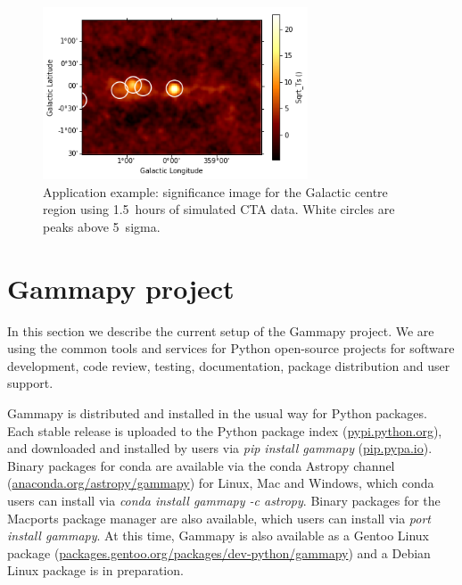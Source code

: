 \documentclass{PoS}
\newcommand{\urlPypi}{\href{https://pypi.python.org}{pypi.python.org}}
\newcommand{\urlPip}{\href{https://pip.pypa.io}{pip.pypa.io}}
\newcommand{\urlAnacondaGammapy}{\href{https://anaconda.org/astropy/gammapy}{anaconda.org/astropy/gammapy}}
\newcommand{\urlGentooGammapy}{\href{https://packages.gentoo.org/packages/dev-python/gammapy}{packages.gentoo.org/packages/dev-python/gammapy}}
\begin{document}


\begin{figure}[t]
\centering
\includegraphics[width=0.7\textwidth]{figures/gammapy_example_sky_image.png}
\caption{
Application example: significance image for the Galactic centre region using
1.5~hours of simulated CTA data.  White circles are peaks above 5~sigma.
}
\label{fig:app}
\end{figure}

\section{Gammapy project}
\label{sec:project}

In this section we describe the current setup of the Gammapy project. We are using the common tools and services for Python open-source projects for software
development, code review, testing, documentation, package distribution and user
support.

Gammapy is distributed and installed in the usual way for Python packages. Each
stable release is uploaded to the Python package index (\urlPypi), and
downloaded and installed by users via {\it pip install gammapy} (\urlPip).
Binary packages for conda are available via the conda Astropy channel
(\urlAnacondaGammapy) for Linux, Mac and Windows, which conda users can install
via {\it conda install gammapy -c astropy}. Binary packages for the Macports
package manager are also available, which users can install via {\it port
install gammapy}. At this time, Gammapy is also available as a Gentoo Linux
package (\urlGentooGammapy) and a Debian Linux package is in preparation.
\end{document}
